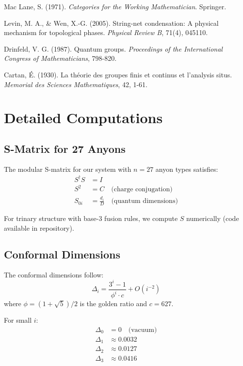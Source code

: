 \documentclass[11pt]{article}
\begin{document}
\begin{thebibliography}{99}
Mac Lane, S. (1971). \textit{Categories for the Working Mathematician}. Springer.

Levin, M. A., \& Wen, X.-G. (2005). String-net condensation: A physical mechanism for topological phases. \textit{Physical Review B}, 71(4), 045110.

Drinfeld, V. G. (1987). Quantum groups. \textit{Proceedings of the International Congress of Mathematicians}, 798-820.

Cartan, É. (1930). La théorie des groupes finis et continus et l'analysis situs. \textit{Memorial des Sciences Mathematiques}, 42, 1-61.

\end{thebibliography}

\appendix

\section{Detailed Computations}

\subsection{S-Matrix for 27 Anyons}

The modular S-matrix for our system with $n=27$ anyon types satisfies:
\begin{align}
S^\dagger S &= I \\
S^2 &= C \quad \text{(charge conjugation)} \\
S_{0i} &= \frac{d_i}{D} \quad \text{(quantum dimensions)}
\end{align}

For trinary structure with base-3 fusion rules, we compute $S$ numerically (code available in repository).

\subsection{Conformal Dimensions}

The conformal dimensions follow:
\begin{equation}
\Delta_i = \frac{3^i - 1}{\phi^i \cdot c} + O(i^{-2})
\end{equation}
where $\phi = (1+\sqrt{5})/2$ is the golden ratio and $c = 627$.

For small $i$:
\begin{align}
\Delta_0 &= 0 \quad \text{(vacuum)} \\
\Delta_1 &\approx 0.0032 \\
\Delta_2 &\approx 0.0127 \\
\Delta_3 &\approx 0.0416
\end{align}
\end{document}
